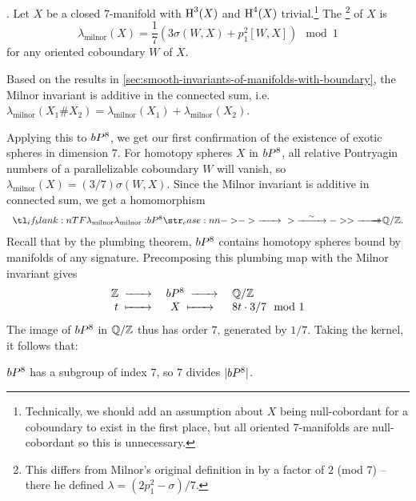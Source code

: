 \begin{definition}.
	Let $X$ be a closed $7$-manifold with $\operatorname{H}^3(X)$ and $\operatorname{H}^4(X)$ trivial.\footnote{Technically, we should add an assumption about $X$ being null-cobordant for a coboundary to exist in the first place, but all oriented $7$-manifolds are null-cobordant so this is unnecessary.} The \footnote{This differs from Milnor's original definition in \cite{milnor1956manifolds} by a factor of $2$ (mod 7) -- there he defined $\lambda=(2p_1^2-\sigma)/7$.} of $X$ is
	\[
		\boxed{\lambda_{\mathrm{milnor}}(X) = \frac{1}{7}\left(3\sigma(W,X)+p_1^2[W,X]\right)\mod 1}
	\]
	for any oriented coboundary $W$ of $X$.
\end{definition}

\begin{remark}
	Based on the results in \cref{sec:smooth-invariants-of-manifolds-with-boundary}, the Milnor invariant is additive in the connected sum, i.e. $\lambda_{\textrm{milnor}}(X_1\# X_2) = \lambda_{\textrm{milnor}}(X_1)+\lambda_{\textrm{milnor}}(X_2)$.
\end{remark}

Applying this to $bP^8$, we get our first confirmation of the existence of exotic spheres in dimension $7$. For homotopy spheres $X$ in $bP^8$, all relative Pontryagin numbers of a parallelizable coboundary $W$ will vanish, so $\lambda_{\textrm{milnor}}(X)=(3/7)\sigma(W, X)$. Since the Milnor invariant is additive in connected sum, we get a homomorphism
\[
		\lkxfunc{\lambda_{\textrm{milnor}}}{\bP^8}{\Q/\Z.}
\]
Recall that by the plumbing theorem, $bP^8$ contains homotopy spheres bound by manifolds of any signature. Precomposing this plumbing map with the Milnor invariant gives
\[
	\begin{array}{rcl}
		\Z \lkxto & \bP^8 \lkxto & \Q/\Z \\
		t \lkxmapsto &X \lkxmapsto & 8t\cdot 3/7 \mod 1
	\end{array}
\]
The image of $bP^8$ in $\mathbb{Q}/\mathbb{Z}$ thus has order $7$, generated by $1/7$. Taking the kernel, it follows that:

\begin{proposition}
	$bP^8$ has a subgroup of index $7$, so $7$ divides $|bP^8|$.
\end{proposition}

\begin{remark}
\end{remark}

